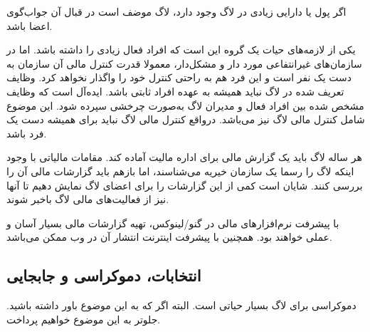اگر پول یا دارایی زیادی در لاگ وجود دارد، لاگ موضف است در قبال آن  جواب‌گوی اعضا باشد.

یکی از لازمه‌های حیات یک گروه این است که افراد فعال زیادی را داشته باشد. اما در سازمان‌های غیرانتفاعی
مورد دار و مشکل‌دار، معمولا قدرت کنترل مالی آن سازمان به دست یک نفر است و این فرد هم به راحتی کنترل
خود را واگذار نخواهد کرد. وظایف تعریف شده در لاگ نباید همیشه به عهده افراد ثابتی باشد. ایده‌آل است که
وظایف مشخص شده بین افراد فعال و مدیران لاگ به‌صورت چرخشی سپرده شود.
این موضوع شامل کنترل مالی لاگ نیز می‌باشد. درواقع کنترل مالی لاگ نباید برای همیشه دست یک فرد باشد.

هر ساله لاگ باید یک گزارش مالی برای اداره مالیت آماده کند. مقامات مالیاتی با وجود اینکه لاگ را رسما
یک سازمان خیریه می‌شناسند، اما بازهم باید گزارشات مالی آن را بررسی کنند. شایان است کمی از این
گزارشات را برای اعضای لاگ نمایش دهیم تا آنها نیز از فعالیت‌های مالی لاگ باخبر شوند.

با پیشرفت نرم‌افزارهای مالی در گنو/لینوکس، تهیه گزارشات مالی بسیار آسان و عملی خواهند بود. همچنین
با پیشرفت اینترنت انتشار آن در وب ممکن می‌باشد.

\subsection{انتخابات، دموکراسی و جابجایی}

دموکراسی برای لاگ بسیار حیاتی است. البته اگر که به این موضوع باور داشته باشید. جلوتر به این موضوع
خواهیم پرداخت.

